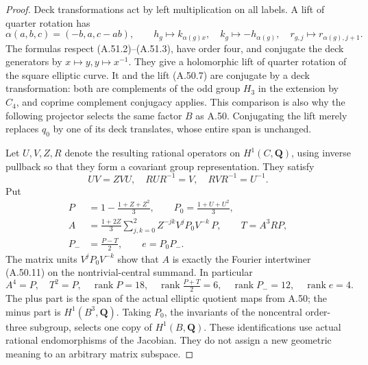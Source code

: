 \begin{proof}
Deck transformations act by left multiplication
on all labels. A lift of quarter rotation has
\[
 \alpha(a,b,c)=(-b,a,c-ab),\qquad
 h_g\longmapsto k_{\alpha(g)x},\quad
 k_g\longmapsto-h_{\alpha(g)},\quad
 r_{g,j}\longmapsto r_{\alpha(g),j+1}.              \tag{A.51.5}
\]
The formulas respect (A.51.2)--(A.51.3), have
order four, and conjugate the deck generators
by \(x\mapsto y,y\mapsto x^{-1}\).
They give a holomorphic lift of quarter rotation
of the square elliptic curve. It and the lift
(A.50.7) are conjugate by a deck transformation:
both are complements of the odd group \(H_3\)
in the extension by \(C_4\), and coprime
complement conjugacy applies. This comparison is
also why the following projector selects the
same factor \(B\) as A.50. Conjugating the lift
merely replaces \(q_0\) by one of its deck
translates, whose entire span is unchanged.

Let \(U,V,Z,R\) denote the resulting rational
operators on \(H^1(C,\mathbf Q)\), using inverse
pullback so that they form a covariant group
representation. They satisfy
\[
 UV=ZVU,\quad RUR^{-1}=V,\quad RVR^{-1}=U^{-1}.
\]
Put
\[
\begin{split}
 P&=1-\frac{1+Z+Z^2}{3},\qquad
 P_0=\frac{1+U+U^2}{3},\\
 A&=\frac{1+2Z}{3}
       \sum_{j,k=0}^2 Z^{-jk}V^jP_0V^{-k}\,P,
       \qquad T=A^3RP,\\
 P_-&=\frac{P-T}{2},\qquad e=P_0P_- .
\end{split}                                                   \tag{A.51.6}
\]
The matrix units \(V^jP_0V^{-k}\) show that
\(A\) is exactly the Fourier intertwiner
(A.50.11) on the nontrivial-central summand.
In particular
\[
 A^4=P,\quad T^2=P,\quad
 \operatorname{rank}P=18,\quad
 \operatorname{rank}\tfrac{P+T}{2}=6,\quad
 \operatorname{rank}P_-=12,\quad\operatorname{rank}e=4.
                                                               \tag{A.51.7}
\]
The plus part is the span of the actual elliptic
quotient maps from A.50; the minus part is
\(H^1(B^3,\mathbf Q)\). Taking \(P_0\), the
invariants of the noncentral order-three subgroup,
selects one copy of \(H^1(B,\mathbf Q)\).
These identifications use actual rational
endomorphisms of the Jacobian. They do not assign
a new geometric meaning to an arbitrary matrix
subspace.


\end{proof}

